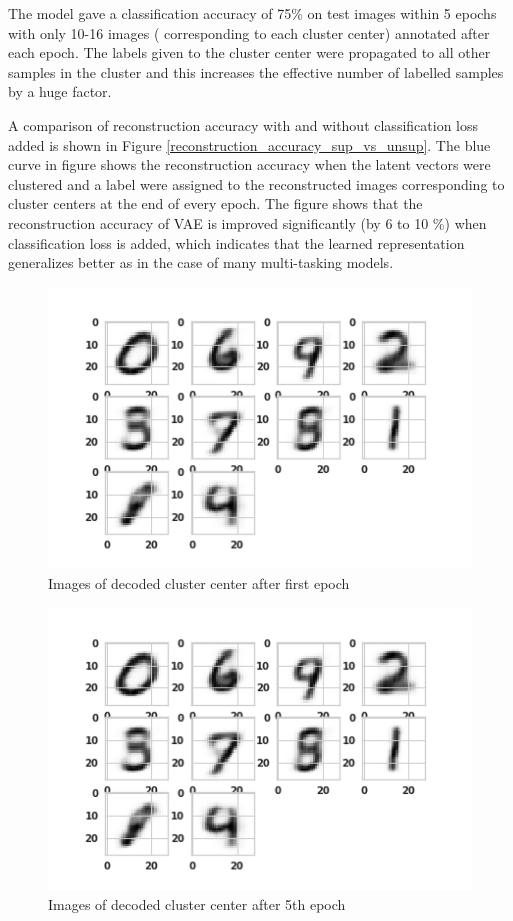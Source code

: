 \documentclass{uai2021} %
\begin{document}
The model gave a classification accuracy of 75\% on test images within 5 epochs with only 10-16 images ( corresponding to each  cluster center) annotated after each epoch.
The labels given to the cluster center were propagated to all other samples in the cluster and this increases the effective number of labelled samples by a huge factor.

A comparison of reconstruction accuracy with and without classification loss added is shown in Figure \ref{reconstruction_accuracy_sup_vs_unsup}.
The blue curve in figure shows the reconstruction accuracy when the latent vectors were clustered and a label were assigned to the reconstructed images corresponding to  cluster centers at the end of every epoch.
The figure shows that the reconstruction accuracy of VAE is improved significantly  (by 6 to 10 \%) when classification loss is added, which indicates that the learned representation generalizes better as in the case of many multi-tasking models.


\begin{figure}[]
\centering
\includegraphics[width=\linewidth]{cluster_centers_epoch_1.0}
\caption{Images of decoded cluster center after first epoch}
\label{cluster_center_1}
\end{figure}

\begin{figure}[]
\centering
\includegraphics[width=\linewidth]{cluster_centers_epoch_1.0}
\caption{Images of decoded cluster center after 5th epoch}
\label{cluster_center_6}
\end{figure}
\end{document}
